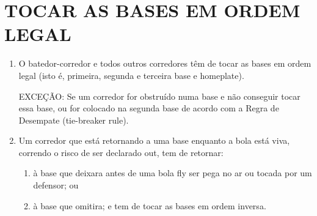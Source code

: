 \section{TOCAR AS BASES EM ORDEM LEGAL}
\begin{enumerate}[label=(\alph*)]
	\item   O batedor-corredor e todos outros corredores têm de tocar as bases em ordem legal (isto é, primeira, segunda e terceira base e \gls{homeplate}).

	EXCEÇÃO: Se um corredor for obstruído numa base e não conseguir tocar essa base, ou for colocado na segunda base de acordo com a Regra de Desempate (\gls{tie-breaker rule}).

	\item  Um corredor que está retornando a uma base enquanto a bola está viva, correndo o risco de ser declarado \gls{out}, tem de retornar:

	\begin{enumerate}[label=\roman*.]
		\item  à base que deixara antes de uma bola \gls{fly} ser pega no ar ou tocada por um defensor; ou
		\item à base que omitira; e tem de tocar as bases em ordem inversa.
	\end{enumerate}


\end{enumerate}
